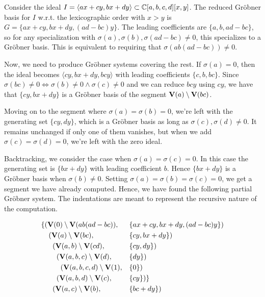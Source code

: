 \begin{example}\upshape
  Consider the ideal $I = \langle ax + cy, bx + dy \rangle \subset \mathbb{C}[a, b, c, d][x, y]$. The reduced Gröbner basis for $I$ w.r.t. the lexicographic order with $x > y$ is $G = \{ax + cy, bx + dy, (ad - bc)y\}$. The leading coefficients are $\{a, b, ad - bc\}$, so for any specialization with $\sigma(a), \sigma(b), \sigma(ad - bc) \neq 0$, this specializes to a Gröbner basis. This is equivalent to requiring that $\sigma(ab(ad-bc)) \neq 0$.

  Now, we need to produce Gröbner systems covering the rest. If $\sigma(a) = 0$, then the ideal becomes $\langle cy, bx + dy, bcy \rangle$ with leading coefficients $\{c, b, bc\}$. Since $\sigma(bc) \neq 0 \iff \sigma(b) \neq 0 \land \sigma(c) \neq 0$ and we can reduce $bcy$ using $cy$, we have that $\{cy, bx + dy\}$ is a Gröbner basis of the segment $\operatorname{\mathbf V}(a) \setminus \operatorname{\mathbf V}(bc)$.

  Moving on to the segment where $\sigma(a) = \sigma(b) = 0$, we're left with the generating set $\{cy, dy\}$, which is a Gröbner basis as long as $\sigma(c), \sigma(d) \neq 0$. It remains unchanged if only one of them vanishes, but when we add $\sigma(c) = \sigma(d) = 0$, we're left with the zero ideal.

  Backtracking, we consider the case when $\sigma(a) = \sigma(c) = 0$. In this case the generating set is $\{bx + dy\}$ with leading coefficient $b$. Hence $\{bx + dy\}$ is a Gröbner basis when $\sigma(b) \neq 0$. Setting $\sigma(a) = \sigma(b) = \sigma(c) = 0$, we get a segment we have already computed. Hence, we have found the following partial Gröbner system. The indentations are meant to represent the recursive nature of the computation.

  \begin{align*}
    \{&(\operatorname{\mathbf V}(0) \setminus \operatorname{\mathbf V}(ab(ad-bc)),& &\{ax + cy, bx + dy, (ad-bc)y\}) \\
      &\;\; (\operatorname{\mathbf V}(a) \setminus \operatorname{\mathbf V}(bc),& &\{cy, bx + dy\}) \\
      &\;\; \;\;(\operatorname{\mathbf V}(a, b) \setminus \operatorname{\mathbf V}(cd),& &\{cy, dy\}) \\
      &\;\; \;\; \;\;(\operatorname{\mathbf V}(a, b, c) \setminus \operatorname{\mathbf V}(d),& &\{dy\}) \\
      &\;\; \;\; \;\; \;\;(\operatorname{\mathbf V}(a, b, c, d) \setminus \operatorname{\mathbf V}(1),& &\{0\}) \\
      &\;\; \;\; \;\;(\operatorname{\mathbf V}(a, b, d) \setminus \operatorname{\mathbf V}(c),& &\{cy\})\}\\
      &\;\; \;\;(\operatorname{\mathbf V}(a, c) \setminus \operatorname{\mathbf V}(b), &&\{bc + dy\})
  \end{align*}


\end{example}
